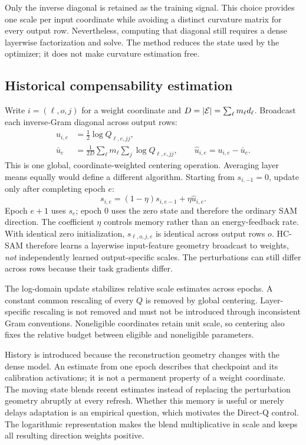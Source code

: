 Only the inverse diagonal is retained as the training signal. This choice provides one scale per input coordinate while avoiding a distinct curvature matrix for every output row. Nevertheless, computing that diagonal still requires a dense layerwise factorization and solve. The method reduces the state used by the optimizer; it does not make curvature estimation free.

\subsection{Historical compensability estimation}
Write $i=(\ell,o,j)$ for a weight coordinate and $D=|\mathcal{E}|=\sum_\ell m_\ell d_\ell$. Broadcast each inverse-Gram diagonal across output rows:
\begin{align}
 u_{i,e}&=\tfrac12\log Q_{\ell,e,jj},\\
 \bar u_e&=\frac{1}{2D}\sum_\ell m_\ell\sum_j\log Q_{\ell,e,jj},\qquad
 \widehat u_{i,e}=u_{i,e}-\bar u_e.
 \label{eq:center}
\end{align}
This is one global, coordinate-weighted centering operation. Averaging layer means equally would define a different algorithm. Starting from $s_{i,-1}=0$, update only after completing epoch $e$:
\begin{equation}
 s_{i,e}=(1-\eta)s_{i,e-1}+\eta\widehat u_{i,e}.
 \label{eq:history}
\end{equation}
Epoch $e+1$ uses $s_e$; epoch $0$ uses the zero state and therefore the ordinary SAM direction. The coefficient $\eta$ controls memory rather than an energy-feedback rate. With identical zero initialization, $s_{\ell,o,j,e}$ is identical across output rows $o$. HC-SAM therefore learns a layerwise input-feature geometry broadcast to weights, \emph{not} independently learned output-specific scales. The perturbations can still differ across rows because their task gradients differ.

The log-domain update stabilizes relative scale estimates across epochs. A constant common rescaling of every $Q$ is removed by global centering. Layer-specific rescaling is not removed and must not be introduced through inconsistent Gram conventions. Noneligible coordinates retain unit scale, so centering also fixes the relative budget between eligible and noneligible parameters.

History is introduced because the reconstruction geometry changes with the dense model. An estimate from one epoch describes that checkpoint and its calibration activations; it is not a permanent property of a weight coordinate. The moving state blends recent estimates instead of replacing the perturbation geometry abruptly at every refresh. Whether this memory is useful or merely delays adaptation is an empirical question, which motivates the Direct-Q control. The logarithmic representation makes the blend multiplicative in scale and keeps all resulting direction weights positive.

